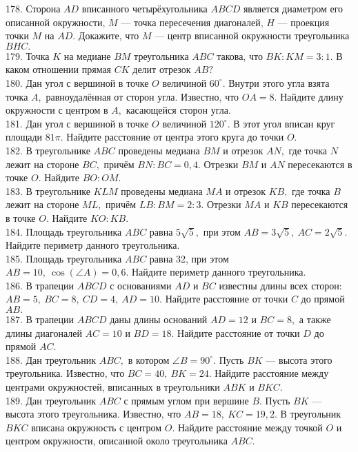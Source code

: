 178. Сторона $AD$ вписанного четырёхугольника $ABCD$ является диаметром его описанной окружности, $M$ --- точка пересечения диагоналей, $H$ --- проекция точки $M$ на $AD.$ Докажите, что $M$ --- центр вписанной окружности треугольника $BHC.$\\
179. Точка $K$ на медиане $BM$ треугольника $ABC$ такова, что $BK:KM=3:1.$ В каком отношении прямая $CK$ делит отрезок $AB?$\\
180. Дан угол с вершиной в точке $O$ величиной $60^\circ.$ Внутри этого угла взята точка $A,$ равноудалённая от сторон угла. Известно, что $OA=8.$ Найдите длину окружности с центром в $A,$ касающейся сторон угла.\\
181. Дан угол с вершиной в точке $O$ величиной $120^\circ.$ В этот угол вписан круг площади $81\pi.$ Найдите расстояние от центра этого круга до точки $O.$\\
182. В треугольнике $ABC$ проведены медиана $BM$ и отрезок $AN,$ где точка $N$ лежит на стороне $BC,$ причём $BN:BC=0,4.$ Отрезки $BM$ и $AN$ пересекаются в точке $O.$ Найдите $BO:OM.$\\
183. В треугольнике $KLM$ проведены медиана $MA$ и отрезок $KB,$ где точка $B$ лежит на стороне $ML,$ причём $LB:BM=2:3.$ Отрезки $MA$ и $KB$ пересекаются в точке $O.$ Найдите $KO:KB.$\\
184. Площадь треугольника $ABC$ равна $5\sqrt{5},$ при этом $AB=3\sqrt{5},\ AC=2\sqrt{5}.$ Найдите периметр данного треугольника.\\
185. Площадь треугольника $ABC$ равна 32, при этом $AB=10,\ \cos(\angle A)=0,6.$ Найдите периметр данного треугольника.\\
186. В трапеции $ABCD$ с основаниями $AD$ и $BC$ известны длины всех сторон: $AB=5,\ BC=8,\ CD=4,\ AD=10.$ Найдите расстояние от точки $C$ до прямой $AB.$\\
187. В трапеции $ABCD$ даны длины оснований $AD=12$ и $BC=8,$ а также длины диагоналей $AC=10$ и $BD=18.$ Найдите расстояние от точки $D$ до прямой $AC.$\\
188. Дан треугольник $ABC,$ в котором $\angle B=90^\circ.$ Пусть $BK$ --- высота этого треугольника. Известно, что $BC=40,\ BK=24.$ Найдите расстояние между центрами окружностей, вписанных в треугольники $ABK$ и $BKC.$\\
189. Дан треугольник $ABC$ с прямым углом при вершине $B.$ Пусть $BK$ --- высота этого треугольника. Известно, что $AB=18,\ KC=19,2.$ В треугольник $BKC$ вписана окружность с центром $O.$ Найдите расстояние между точкой $O$ и центром окружности, описанной около треугольника $ABC.$\\
